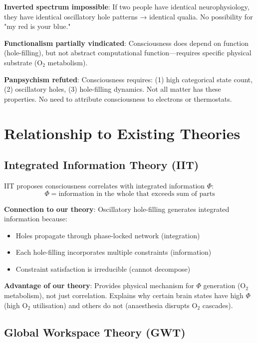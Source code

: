 \documentclass[11pt,a4paper]{article}
\begin{document}
\textbf{Inverted spectrum impossible}: If two people have identical neurophysiology, they have identical oscillatory hole patterns → identical qualia. No possibility for "my red is your blue."

\textbf{Functionalism partially vindicated}: Consciousness does depend on function (hole-filling), but not abstract computational function—requires specific physical substrate (O$_2$ metabolism).

\textbf{Panpsychism refuted}: Consciousness requires: (1) high categorical state count, (2) oscillatory holes, (3) hole-filling dynamics. Not all matter has these properties. No need to attribute consciousness to electrons or thermostats.

\section{Relationship to Existing Theories}

\subsection{Integrated Information Theory (IIT)}

IIT \cite{tononi2016integrated} proposes consciousness correlates with integrated information $\Phi$:
\begin{equation}
\Phi = \text{information in the whole that exceeds sum of parts}
\end{equation}

\textbf{Connection to our theory}: Oscillatory hole-filling generates integrated information because:
\begin{itemize}
\item Holes propagate through phase-locked network (integration)
\item Each hole-filling incorporates multiple constraints (information)
\item Constraint satisfaction is irreducible (cannot decompose)
\end{itemize}

\textbf{Advantage of our theory}: Provides physical mechanism for $\Phi$ generation (O$_2$ metabolism), not just correlation. Explains why certain brain states have high $\Phi$ (high O$_2$ utilisation) and others do not (anaesthesia disrupts O$_2$ cascades).

\subsection{Global Workspace Theory (GWT)}
\end{document}
